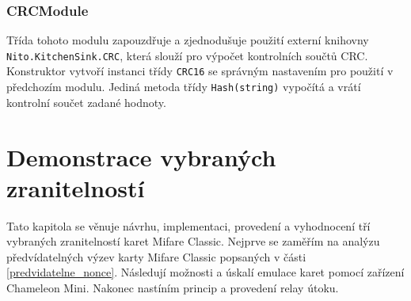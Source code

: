 \subsection*{CRCModule}
Třída tohoto modulu zapouzdřuje a zjednodušuje použití externí knihovny \\\verb|Nito.KitchenSink.CRC|\footnotemark, která slouží pro výpočet kontrolních součtů CRC. Konstruktor vytvoří instanci třídy \verb|CRC16| se správným nastavením pro použití v předchozím modulu. Jediná metoda třídy \verb|Hash(string)| vypočítá a vrátí kontrolní součet zadané hodnoty. 


\chapter{Demonstrace vybraných zranitelností}
Tato kapitola se věnuje návrhu, implementaci, provedení a vyhodnocení tří vybraných zranitelností karet Mifare Classic. Nejprve se zaměřím na analýzu předvídatelných výzev karty Mifare Classic popsaných v části \ref{predvidatelne_nonce}. Následují možnosti a úskalí emulace karet pomocí zařízení Chameleon Mini. Nakonec nastíním princip a provedení relay útoku.\par 

